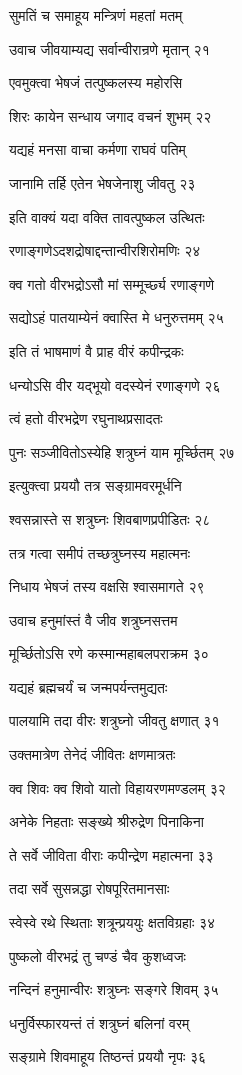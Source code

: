 सुमतिं च समाहूय मन्त्रिणं महतां मतम्

उवाच जीवयाम्यद्य सर्वान्वीरान्रणे मृतान् २१

एवमुक्त्वा भेषजं तत्पुष्कलस्य महोरसि

शिरः कायेन सन्धाय जगाद वचनं शुभम् २२

यद्यहं मनसा वाचा कर्मणा राघवं पतिम्

जानामि तर्हि एतेन भेषजेनाशु जीवतु २३

इति वाक्यं यदा वक्ति तावत्पुष्कल उत्थितः

रणाङ्गणेऽदशद्रोषाद्दन्तान्वीरशिरोमणिः २४

क्व गतो वीरभद्रोऽसौ मां सम्मूर्च्छ्य रणाङ्गणे

सद्योऽहं पातयाम्येनं क्वास्ति मे धनुरुत्तमम् २५

इति तं भाषमाणं वै प्राह वीरं कपीन्द्रकः

धन्योऽसि वीर यद्भूयो वदस्येनं रणाङ्गणे २६

त्वं हतो वीरभद्रेण रघुनाथप्रसादतः

पुनः सञ्जीवितोऽस्येहि शत्रुघ्नं याम मूर्च्छितम् २७

इत्युक्त्वा प्रययौ तत्र सङ्ग्रामवरमूर्धनि

श्वसन्नास्ते स शत्रुघ्नः शिवबाणप्रपीडितः २८

तत्र गत्वा समीपं तच्छत्रुघ्नस्य महात्मनः

निधाय भेषजं तस्य वक्षसि श्वासमागते २९

उवाच हनुमांस्तं वै जीव शत्रुघ्नसत्तम

मूर्च्छितोऽसि रणे कस्मान्महाबलपराक्रम ३०

यद्यहं ब्रह्मचर्यं च जन्मपर्यन्तमुद्यतः

पालयामि तदा वीरः शत्रुघ्नो जीवतु क्षणात् ३१

उक्तमात्रेण तेनेदं जीवितः क्षणमात्रतः

क्व शिवः क्व शिवो यातो विहायरणमण्डलम् ३२

अनेके निहताः सङ्ख्ये श्रीरुद्रेण पिनाकिना

ते सर्वे जीविता वीराः कपीन्द्रेण महात्मना ३३

तदा सर्वे सुसन्नद्धा रोषपूरितमानसाः

स्वेस्वे रथे स्थिताः शत्रून्प्रययुः क्षतविग्रहाः ३४

पुष्कलो वीरभद्रं तु चण्डं चैव कुशध्वजः

नन्दिनं हनुमान्वीरः शत्रुघ्नः सङ्गरे शिवम् ३५

धनुर्विस्फारयन्तं तं शत्रुघ्नं बलिनां वरम्

सङ्ग्रामे शिवमाहूय तिष्ठन्तं प्रययौ नृपः ३६

